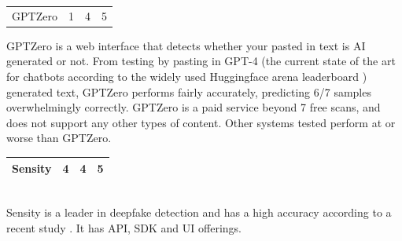 \documentclass[12pt,a4paper]{article}
\begin{document}
\begin{table}[h]
    \centering
    \begin{tabular}{|M{3cm}|M{3cm}|M{3cm}|M{3cm}|}
    GPTZero & 1 & 4 & 5\\
                           
\end{tabular}
\end{table}
\noindent GPTZero is a web interface that detects whether your pasted in text is AI generated or not. From testing by pasting in GPT-4 (the current state of the art for chatbots according to the widely used Huggingface arena leaderboard \cite{huggingface}) generated text, GPTZero performs fairly accurately, predicting 6/7 samples overwhelmingly correctly. GPTZero is a paid service beyond 7 free scans, and does not support any other types of content. Other systems tested perform at or worse than GPTZero.
\begin{table}[h]
    \centering
    \begin{tabular}{|M{3cm}|M{3cm}|M{3cm}|M{3cm}|}
    Sensity & 4 & 4 & 5\\
    \hline
\end{tabular}
\end{table}
\\\noindent Sensity is a leader in deepfake detection and has a high accuracy according to a recent study \cite{sensityStudy}. It has API, SDK and UI offerings.
\end{document}
